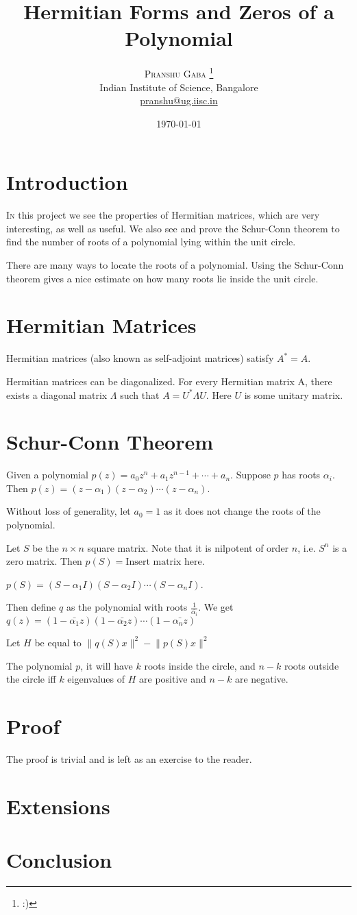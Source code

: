\documentclass[twofold, twocolumn]{article}
\author{%
\textsc{Pranshu Gaba} \thanks{:)} \\[1ex]
\normalsize Indian Institute of Science, Bangalore \\
\normalsize \href{mailto:pranshu@ug.iisc.in}{pranshu@ug.iisc.in}}
\title{Hermitian Forms and Zeros of a Polynomial}
\date{\today}
\newcommand*\conj[1]{\bar{#1}}
\begin{document}
\maketitle

\section{Introduction}

\lettrine[nindent=0em,lines=2]{I}n this project we see the properties of Hermitian matrices, which are very interesting, as well as useful. We also see and prove the Schur-Conn theorem to find the number of roots of a polynomial lying within the unit circle. 

There are many ways to locate the roots of a polynomial. Using the Schur-Conn theorem gives a nice estimate on how many roots lie inside the unit circle.


\section{Hermitian Matrices}
Hermitian matrices (also known as self-adjoint matrices) satisfy \(A^* = A\). 

Hermitian matrices can be diagonalized. For every Hermitian matrix A, there exists a diagonal matrix \(\Lambda\) such that \(A = U^* \Lambda U\). Here \(U\) is some unitary matrix. 

\section{Schur-Conn Theorem}

Given a polynomial \(p(z) = a_0 z^n + a_1z^{n-1} + \cdots + a_n\). Suppose \(p\) has roots \(\alpha_i\). Then \(p(z) = (z - \alpha_1) (z - \alpha_2) \cdots (z - \alpha_n)\). 

Without loss of generality, let \(a_0 = 1\) as it does not change the roots of the polynomial. 

Let \(S\) be the \(n \times n\) square matrix. Note that it is nilpotent of order \(n\), i.e. \(S^n\) is a zero matrix. Then \(p(S) = \text{Insert matrix here}\). 


\(p(S) = (S - \alpha_1I) (S - \alpha_2 I) \cdots (S - \alpha_n I)\). 

Then define \(q\) as the polynomial with roots \(\frac {1}{\conj{\alpha_i}}\). We get \(q(z) = (1 - \conj{\alpha_1}z) (1 - \conj{\alpha_2}z) \cdots (1 - \conj{\alpha_nz})\)


Let \(H\) be equal to \(\lVert q(S) x \rVert^2 - \lVert p(S) x \rVert^2\)


The polynomial \(p\), it will have \(k\) roots inside the circle, and \(n-k\) roots outside the circle iff \(k\) eigenvalues of \(H\) are positive and \(n-k\) are negative. 

\section{Proof}
The proof is trivial and is left as an exercise to the reader. 

\section{Extensions}

\section{Conclusion}
\end{document}
